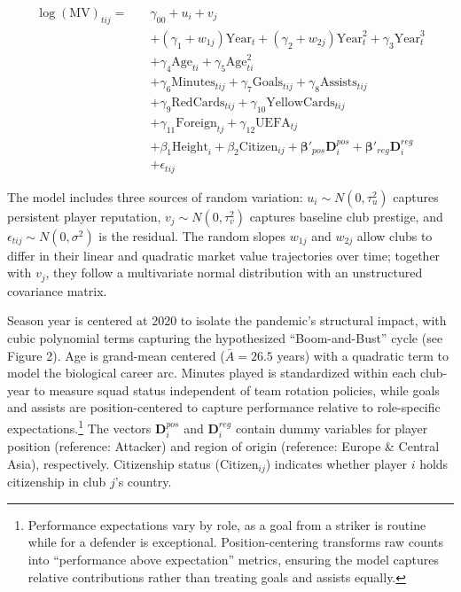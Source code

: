 \documentclass[
  12pt,
]{article}
\begin{document}
\[
\begin{aligned}
\log(\text{MV})_{tij} = \quad & \gamma_{00} + u_i + v_j \\[6pt]
& + (\gamma_1 + w_{1j})\text{Year}_t + (\gamma_2 + w_{2j})\text{Year}_t^2 + \gamma_3\text{Year}_t^3 \\[6pt]
& + \gamma_4\text{Age}_{ti} + \gamma_5\text{Age}_{ti}^2 \\[6pt]
& + \gamma_6\text{Minutes}_{tij} + \gamma_7\text{Goals}_{tij} + \gamma_8\text{Assists}_{tij} \\[6pt]
& + \gamma_9\text{RedCards}_{tij} + \gamma_{10}\text{YellowCards}_{tij} \\[6pt]
& + \gamma_{11}\text{Foreign}_{tj} + \gamma_{12}\text{UEFA}_{tj} \\[6pt]
& + \beta_1\text{Height}_i + \beta_2\text{Citizen}_{ij} + \boldsymbol{\beta}'_{pos}\mathbf{D}^{pos}_i + \boldsymbol{\beta}'_{reg}\mathbf{D}^{reg}_i \\[6pt]
& + \epsilon_{tij}
\end{aligned}
\]

The model includes three sources of random variation:
\(u_i \sim N(0, \tau^2_u)\) captures persistent player reputation,
\(v_j \sim N(0, \tau^2_v)\) captures baseline club prestige, and
\(\epsilon_{tij} \sim N(0, \sigma^2)\) is the residual. The random
slopes \(w_{1j}\) and \(w_{2j}\) allow clubs to differ in their linear
and quadratic market value trajectories over time; together with
\(v_j\), they follow a multivariate normal distribution with an
unstructured covariance matrix.

Season year is centered at 2020 to isolate the pandemic's structural
impact, with cubic polynomial terms capturing the hypothesized
``Boom-and-Bust'' cycle (see Figure 2). Age is grand-mean centered
(\(\bar{A} = 26.5\) years) with a quadratic term to model the biological
career arc. Minutes played is standardized within each club-year to
measure squad status independent of team rotation policies, while goals
and assists are position-centered to capture performance relative to
role-specific expectations.\footnote{Performance expectations vary by
  role, as a goal from a striker is routine while for a defender is
  exceptional. Position-centering transforms raw counts into
  ``performance above expectation'' metrics, ensuring the model captures
  relative contributions rather than treating goals and assists equally.}
The vectors \(\mathbf{D}^{pos}_i\) and \(\mathbf{D}^{reg}_i\) contain
dummy variables for player position (reference: Attacker) and region of
origin (reference: Europe \& Central Asia), respectively. Citizenship
status (\(\text{Citizen}_{ij}\)) indicates whether player \(i\) holds
citizenship in club \(j\)'s country.
\end{document}

